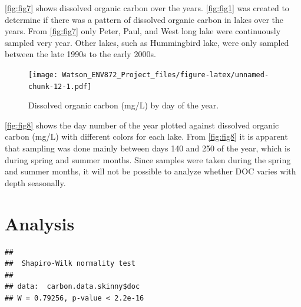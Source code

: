 \documentclass[12pt,]{article}
\newenvironment{Shaded}{\begin{snugshade}}{\end{snugshade}}
\newcommand{\KeywordTok}[1]{\textcolor[rgb]{0.13,0.29,0.53}{\textbf{#1}}}
\newcommand{\CommentTok}[1]{\textcolor[rgb]{0.56,0.35,0.01}{\textit{#1}}}
\newcommand{\OperatorTok}[1]{\textcolor[rgb]{0.81,0.36,0.00}{\textbf{#1}}}
\newcommand{\NormalTok}[1]{#1}
\begin{document}
\autoref{fig:fig7} shows dissolved organic carbon over the years.
\autoref{fig:fig1} was created to determine if there was a pattern of
dissolved organic carbon in lakes over the years. From
\autoref{fig:fig7} only Peter, Paul, and West long lake were
continuously sampled very year. Other lakes, such as Hummingbird lake,
were only sampled between the late 1990s to the early 2000s.

\begin{figure}
\centering
\texttt{[image: Watson\_ENV872\_Project\_files/figure-latex/unnamed-chunk-12-1.pdf]}
\caption{\label{fig:fig8} Dissolved organic carbon (mg/L) by day of the
year.}
\end{figure}

\autoref{fig:fig8} shows the day number of the year plotted against
dissolved organic carbon (mg/L) with different colors for each lake.
From \autoref{fig:fig8} it is apparent that sampling was done mainly
between days 140 and 250 of the year, which is during spring and summer
months. Since samples were taken during the spring and summer months, it
will not be possible to analyze whether DOC varies with depth
seasonally.

\newpage

\section{Analysis}\label{analysis}

\begin{Shaded}
\end{Shaded}

\begin{verbatim}
## 
##  Shapiro-Wilk normality test
## 
## data:  carbon.data.skinny$doc
## W = 0.79256, p-value < 2.2e-16
\end{verbatim}

\begin{Shaded}
\end{Shaded}
\end{document}
